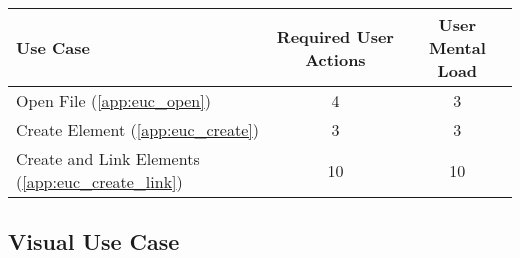 
\begin{tabularx}{\textwidth}{Xcc}
\textbf{Use Case} & \textbf{Required User Actions} & \textbf{User Mental Load}\\
\hline
Open File (\ref{app:euc_open})                       & 4 & 3 \\
Create Element (\ref{app:euc_create})                & 3 & 3 \\
Create and Link Elements (\ref{app:euc_create_link}) & 10 & 10
\end{tabularx}

\subsection*{Visual Use Case}




